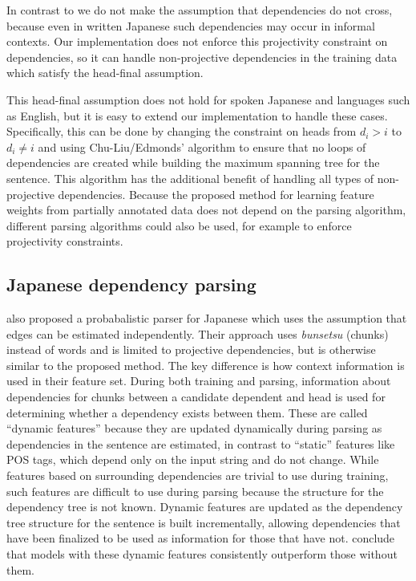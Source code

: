 \documentclass[english]{jnlp_1.4}
\begin{document}
In contrast to  we do not make the
assumption that dependencies do not cross, because even in written
Japanese such dependencies may occur in informal contexts. Our
implementation does not enforce this projectivity constraint on
dependencies, so it can handle non-projective dependencies in the
training data which satisfy the head-final assumption.

This head-final assumption does not hold for spoken Japanese and
languages such as English, but it is easy to extend our implementation
to handle these cases. Specifically, this can be done by changing the
constraint on heads from $d_i>i$ to $d_i \ne i$ and using
Chu-Liu/Edmonds' algorithm to ensure that no loops of dependencies are
created while building the maximum spanning tree for the
sentence. This algorithm has the additional benefit of handling all
types of non-projective dependencies. Because the proposed method for
learning feature weights from partially annotated data does not depend
on the parsing algorithm, different parsing algorithms could also be
used, for example to enforce projectivity constraints.


\subsection{Japanese dependency parsing}
\label{sec:japanese-depparse}

 also proposed a probabalistic parser for Japanese
which uses the assumption that edges can be estimated
independently. Their approach uses \textit{bunsetsu} (chunks) instead of words
and is limited to projective dependencies, but is otherwise similar to
the proposed method. The key difference is how context information is
used in their feature set. During both training and parsing,
information about dependencies for chunks between a candidate
dependent and head is used for determining whether a dependency exists
between them. These are called ``dynamic features'' because they are
updated dynamically during parsing as dependencies in the sentence are
estimated, in contrast to ``static'' features like POS tags, which
depend only on the input string and do not change. While features
based on surrounding dependencies are trivial to use during training,
such features are difficult to use during parsing because the
structure for the dependency tree is not known. Dynamic features are
updated as the dependency tree structure for the sentence is built
incrementally, allowing dependencies that have been finalized to be
used as information for those that have not. 
conclude that models with these dynamic features consistently
outperform those without them.
\end{document}
